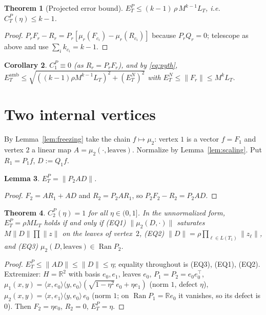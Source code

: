 \documentclass[11pt]{amsart}
\newtheorem{theorem}{Theorem}[section]
\newtheorem{lemma}[theorem]{Lemma}
\newtheorem{corollary}[theorem]{Corollary}
\theoremstyle{definition}
\newcommand{\R}{\mathbb{R}}
\newcommand{\Ran}{\operatorname{Ran}}
\newcommand{\amb}{\mathrm{amb}}
\newcommand{\norm}[1]{\lVert #1\rVert}
\newcommand{\ip}[2]{\langle #1,#2\rangle}
\begin{document}
\begin{theorem}[Projected error bound]\label{thm:projected}
$E^P_T\le (k-1)\,\rho\,M^{k-1}L_T$, i.e.\ $C^P_T(\eta)\le k-1$.
\end{theorem}
\begin{proof}
$P_rF_r-R_r=P_r[\mu_r(F_{c_i})-\mu_r(R_{c_i})]$ because $P_rQ_r=0$; telescope as above
and use $\sum_ik_{c_i}=k-1$.
\end{proof}

\begin{corollary}
$C_1^P\equiv0$ (as $R_r=P_rF_r$), and by \eqref{eq:pyth},
$E^\amb_T\le\sqrt{((k-1)\rho M^{k-1}L_T)^2+(E^N_T)^2}$ with
$E^N_T\le\norm{F_r}\le M^kL_T$.
\end{corollary}

\section{Two internal vertices}

By Lemma~\ref{lem:freezing} take the chain $f\mapsto\mu_2$: vertex $1$ is a vector
$f=F_1$ and vertex $2$ a linear map $A=\mu_2(\cdot,\text{leaves})$. Normalize by
Lemma~\ref{lem:scaling}. Put $R_1=P_1f$, $D:=Q_1f$.

\begin{lemma}\label{lem:k2identity}
$E^P_T=\norm{P_2AD}$.
\end{lemma}
\begin{proof}
$F_2=AR_1+AD$ and $R_2=P_2AR_1$, so $P_2F_2-R_2=P_2AD$.
\end{proof}

\begin{theorem}\label{thm:k2}
$C^P_2(\eta)=1$ for all $\eta\in(0,1]$. In the unnormalized form,
$E^P_T=\rho ML_T$ holds if and only if
\textup{(EQ1)} $\norm{\mu_2(D,\cdot)}$ saturates $M\norm{D}\prod\norm{z}$ on the leaves of vertex~$2$,
\textup{(EQ2)} $\norm{D}=\rho\prod_{\ell\in L(T_1)}\norm{z_\ell}$, and
\textup{(EQ3)} $\mu_2(D,\text{leaves})\in\Ran P_2$.
\end{theorem}
\begin{proof}
$E^P_T\le\norm{AD}\le\norm{D}\le\eta$; equality throughout is (EQ3), (EQ1), (EQ2).
Extremizer: $H=\R^2$ with basis $e_0,e_1$, leaves $e_0$, $P_1=P_2=e_0e_0^{\top}$,
$\mu_1(x,y)=\ip{x}{e_0}\ip{y}{e_0}(\sqrt{1-\eta^2}\,e_0+\eta e_1)$ (norm $1$, defect $\eta$),
$\mu_2(x,y)=\ip{x}{e_1}\ip{y}{e_0}\,e_0$ (norm $1$; on $\Ran P_1=\R e_0$ it vanishes,
so its defect is $0$). Then $F_2=\eta e_0$, $R_2=0$, $E^P_T=\eta$.
\end{proof}
\end{document}
